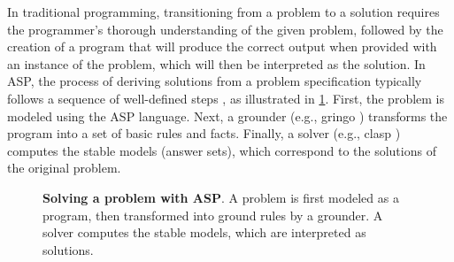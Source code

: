 \documentclass[11pt,leqno]{amsart}
\begin{document}
In traditional programming, transitioning from a problem to a solution 
requires the programmer's thorough understanding of the given problem, 
followed by the creation of a program that will produce the correct output 
when provided with an instance of the problem, which will then be interpreted as the solution. 
In ASP, the process of deriving solutions from a problem specification 
typically follows a sequence of well-defined steps \cite{Gebser2013}, 
as illustrated in \cref{fig:asp-solving}. 
First, the problem is modeled using the ASP language. 
Next, a grounder (e.g., gringo \cite{Gebser2014}) transforms the program into a set of basic rules and facts. 
Finally, a solver (e.g., clasp \cite{Holldobler2014}) computes the stable models (answer sets), 
which correspond to the solutions of the original problem.

\begin{figure}[htb]
    \begin{center}
    \end{center}
		\caption{\textbf{Solving a problem with ASP}. A problem is first modeled as a program, then transformed into ground rules by a grounder. A solver computes the stable models, which are interpreted as solutions.}
    \label{fig:asp-solving}
\end{figure}
\end{document}
